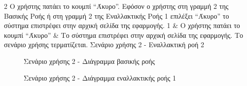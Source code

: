 \useCaseAlternateFlowTable
{2}
{Ο χρήστης πατάει το κουμπί ``Άκυρο''.}
{Εφόσον ο χρήστης στη γραμμή 2 της Βασικής Ροής ή στη γραμμή 2 της Εναλλακτικής Ροής 1 επιλέξει ``Άκυρο'' το σύστημα επιστρέφει στην αρχική σελίδα της εφαρμογής.}
{
    1 & Ο χρήστης πατάει το κουμπί ``Άκυρο'' & Το σύστημα επιστρέφει στην αρχική σελίδα της εφαρμογής.
}
{Το σενάριο χρήσης τερματίζεται.}
{Σενάριο χρήσης 2 - Εναλλακτική ροή 2}
{\label{table:3-4-use-case-create-topic-alternate-flow-2}}

\begin{figure}[H]
    \centering
    
    \caption{Σενάριο χρήσης 2 - Διάγραμμα βασικής ροής}
    \label{figure:3-4-use-case-create-topic-base-flow-sequence-diagram}
\end{figure}

\begin{figure}[H]
    \centering
    
    \caption{Σενάριο χρήσης 2 - Διάγραμμα εναλλακτικής ροής 1}
    \label{figure:3-4-use-case-create-topic-alternate-flow-1-sequence-diagram}
\end{figure}
